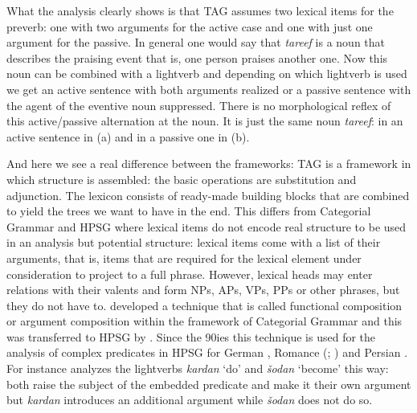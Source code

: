 What the analysis clearly shows is that TAG assumes two lexical items for the preverb: one with two
arguments for the active case and one with just one argument for the passive. In general one would
say that \emph{tareef} is a noun that describes the praising event that is, one 
person praises another one. Now this noun can be combined with a lightverb and depending on which
lightverb is used we get an active sentence with both arguments realized or a passive sentence with
the agent of the eventive noun suppressed. There is no morphological reflex of this active/passive
alternation at the noun. It is just the same noun \emph{tareef}: in an active sentence in (a)
and in a passive one in (b).

And here we see a real difference between the frameworks: TAG is a framework in which structure is
assembled: the basic operations are substitution and adjunction. The lexicon consists of ready-made
building blocks that are combined to yield the trees we want to have in the end. This differs from
Categorial Grammar %
and HPSG %
where lexical items do not
encode real structure to be used in an analysis but potential structure: lexical items come with a
list of their arguments, that is, items that are required for the lexical element under
consideration to project to a full phrase. However, lexical heads may enter
relations with their valents and form NPs, APs, VPs, PPs or other phrases, but they do not have
to. \citet{Geach70a} developed a technique that is called functional composition or argument
composition within the framework of Categorial Grammar and this was transferred to HPSG by
\citet{HN89a,HN94a}. Since the 90ies this technique is used for the analysis of complex predicates
in HPSG for German \citep{HN89a,HN94a,Kiss95a,Meurers99a,Mueller99a,Kathol2000a},
Romance (\citealp[]{MS97a-u}; \citealp{Monachesi98a}) and Persian \citep{MuellerPersian}. For instance \citet[]{MuellerPersian} analyzes the lightverbs \emph{kardan} `do' and \emph{šodan} `become' this
way: both raise the subject of the embedded predicate and make it their own argument but
\emph{kardan} introduces an additional argument while \emph{šodan} does not do so.

